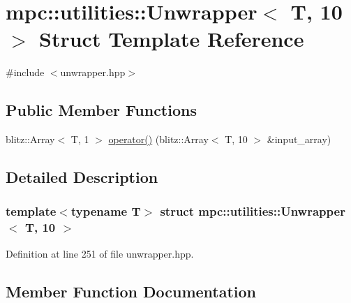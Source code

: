 \hypertarget{structmpc_1_1utilities_1_1_unwrapper_3_01_t_00_0110_01_4}{}\section{mpc\+:\+:utilities\+:\+:Unwrapper$<$ T, 10 $>$ Struct Template Reference}
\label{structmpc_1_1utilities_1_1_unwrapper_3_01_t_00_0110_01_4}


{\ttfamily \#include $<$unwrapper.\+hpp$>$}

\subsection*{Public Member Functions}
\begin{DoxyCompactItemize}
\item 
blitz\+::\+Array$<$ T, 1 $>$ \mbox{\hyperlink{structmpc_1_1utilities_1_1_unwrapper_3_01_t_00_0110_01_4_a3a03d61a8d1ee0ee719b4d0de2f32fac}{operator()}} (blitz\+::\+Array$<$ T, 10 $>$ \&input\+\_\+array)
\end{DoxyCompactItemize}


\subsection{Detailed Description}
\subsubsection*{template$<$typename T$>$\newline
struct mpc\+::utilities\+::\+Unwrapper$<$ T, 10 $>$}



Definition at line 251 of file unwrapper.\+hpp.



\subsection{Member Function Documentation}
\mbox{\label{structmpc_1_1utilities_1_1_unwrapper_3_01_t_00_0110_01_4_a3a03d61a8d1ee0ee719b4d0de2f32fac}} 
